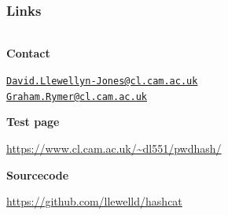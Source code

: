 \documentclass[handout, notes=hide]{beamer}
\newcommand{\emaillink}[1]{\href{mailto:#1}{\nolinkurl{#1}}}
\begin{document}

\begin{frame}
\frametitle{Links}
\framesubtitle{}
\setlength{\parskip}{0.5em}

\begin{columns}[T]
\begin{column}[T]{1.0\textwidth}
\setlength{\parskip}{0.5em}

\centering

{\bf Contact}

\emaillink{David.Llewellyn-Jones@cl.cam.ac.uk} \\
\emaillink{Graham.Rymer@cl.cam.ac.uk}

{\bf Test page}

\url{https://www.cl.cam.ac.uk/~dl551/pwdhash/}

{\bf Sourcecode}

\url{https://github.com/llewelld/hashcat}

\end{column}
\end{columns}


\end{frame}
\note{
\setlength{\parskip}{0.5em}
}



















\end{document}
